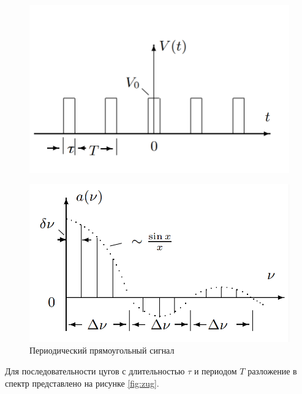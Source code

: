 \documentclass[a4paper]{article}
\begin{document}
\begin{figure}[h]
	\begin{minipage}{0.49\linewidth}
		\centering
		\includegraphics[width=0.9\linewidth]{"square"}
		\label{fig:spectr}
	\end{minipage}
	\begin{minipage}{0.49\linewidth}
		\centering
		\includegraphics[width=0.9\linewidth]{"spectre square"}
	\end{minipage}
	\caption{Периодический прямоугольный сигнал}
	\label{fig:sq}
\end{figure}

Для последовательности цугов с длительностью $ \tau  $ и периодом $ T $ разложение в спектр представлено на рисунке \ref{fig:zug}.
\end{document}

